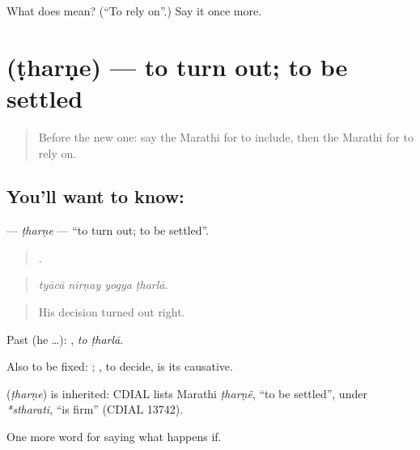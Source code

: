\begin{tcolorbox}[breakable,colback=teal!4,colframe=teal!35!black,title={Before you move on}]
What does  mean? (\textquotedblleft{}To rely on\textquotedblright{}.) Say it once more.
\end{tcolorbox}
\section[\texorpdfstring{\mr{ठरणे} (ṭharṇe)}{ठरणे (ṭharṇe)}]{ (ṭharṇe) — to turn out; to be settled}

\label{lesson:MR-C387-tharne}



\begin{quote}
Before the new one: say the Marathi for to include, then the Marathi for to rely on.
\end{quote}

\subsection*{You'll want to know: }
\textbf{} — \emph{ṭharṇe} — \textquotedblleft{}to turn out; to be settled\textquotedblright{}.

\begin{quote}
   .
\end{quote}

\begin{quote}
\emph{tyācā nirṇay yogya ṭharlā.}
\end{quote}

\begin{quote}
His decision turned out right.
\end{quote}

Past (he …):  , \emph{to ṭharlā}.

Also to be fixed:  ; , to decide, is its causative.

\begin{cousinweb}
\textbf{} (\emph{ṭharṇe}) is inherited: CDIAL lists Marathi \emph{ṭharṇẽ}, \textquotedblleft{}to be settled\textquotedblright{}, under \emph{*stharati}, \textquotedblleft{}is firm\textquotedblright{} (CDIAL 13742).
\end{cousinweb}

\begin{grammarlens}[title={What you've built}]
One more word for saying what happens if.
\end{grammarlens}

